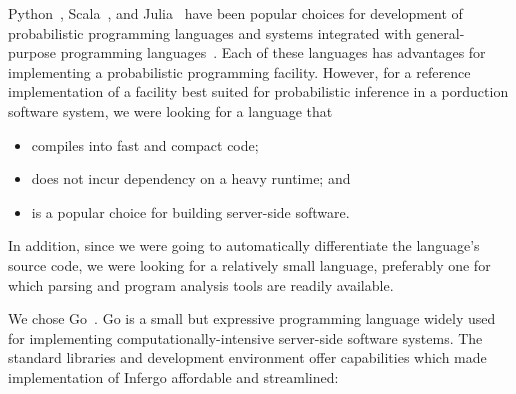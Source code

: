 \documentclass[sigplan,review,10pt,anonymous]{acmart}
\begin{document}
\begin{sloppypar}
Python~\cite{Python95}, Scala~\cite{Scala06}, and
Julia~\cite{Julia14} have been popular choices for development
of probabilistic programming languages and systems integrated
with general-purpose programming
languages~\cite{S16,MMW18,BCJ+19,P09,Rainier,GXG18,ISF+18}.
Each of these languages has advantages for implementing a
probabilistic programming facility. However, for a reference
implementation of a facility best suited for probabilistic
inference in a porduction software system, we were looking
for a language that \begin{itemize}
	\item compiles into fast and compact code;
	\item does not incur dependency on a heavy runtime; and
	\item is a popular choice for building server-side software.
\end{itemize}
In addition, since we were going to automatically differentiate
the language's source code, we were looking for a relatively
small language, preferably one for which parsing and program
analysis tools are readily available. 

We chose Go~\cite{Golang}. Go is a small but expressive
programming language widely used for implementing
computationally-intensive server-side software systems. 
The standard libraries and development environment offer
capabilities which made implementation of Infergo affordable
and streamlined:


\end{sloppypar}
\end{document}
